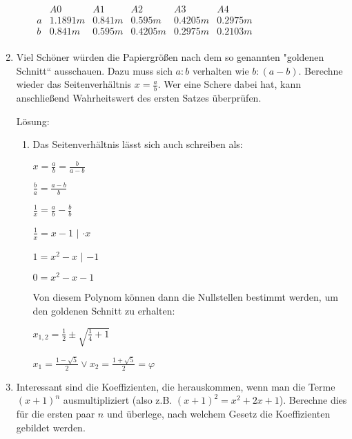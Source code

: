\documentclass[main.tex]{subfiles}
\begin{document}
\begin{enumerate}
\begin{enumerate}
		            \(
		            \begin{array}{cccccc}
			              & A0       & A1      & A2       & A3       & A4       \\
			            \hline
			            a & 1.1891 m & 0.841 m & 0.595 m  & 0.4205 m & 0.2975 m \\
			            b & 0.841 m  & 0.595 m & 0.4205 m & 0.2975 m & 0.2103 m \\
		            \end{array}
		            \)
	      \end{enumerate}
	\item Viel Schöner würden die Papiergrößen nach dem so genannten "goldenen Schnitt“ ausschauen.
	      Dazu muss sich \(
	      a : b
	      \) verhalten wie \(
	      b : (a - b)
	      \). Berechne wieder das Seitenverhältnis \(
	      x = \frac{a}{b}
	      \). Wer eine Schere dabei hat,
	      kann anschließend Wahrheitswert des ersten Satzes überprüfen.

	      Lösung:
	      \begin{enumerate}
		      \item Das Seitenverhältnis lässt sich auch schreiben als:

		            \(
		            x
		            = \frac{a}{b}
		            = \frac{b}{a-b}
		            \)

		            \(
		            \frac{b}{a}
		            = \frac{a-b}{b}
		            \)

		            \(
		            \frac{1}{x}
		            = \frac{a}{b} - \frac{b}{b}
		            \)

		            \(
		            \frac{1}{x}
		            = x - 1
		            \)
		            \(|\) \(
		            \cdot x
		            \)

		            \(
		            1
		            = x^2 - x
		            \)
		            \(|\) \(
		            -1
		            \)

		            \(
		            0 = x^2 - x - 1
		            \)

		            Von diesem Polynom können dann die Nullstellen bestimmt werden, um den goldenen Schnitt zu erhalten:

		            \(
		            x_{1,2} = \frac{1}{2} \pm \sqrt{
			            \frac{1}{4} + 1
		            }
		            \)

		            \(
		            x_1 = \frac{1 - \sqrt{5}}{2} \lor
		            x_2 = \frac{1 + \sqrt{5}}{2} = \varphi
		            \)
	      \end{enumerate}
	\item Interessant sind die Koeffizienten, die herauskommen, wenn man die Terme \(
	      (x + 1)^n
	      \) ausmultipliziert (also z.B. \(
	      (x + 1)^2 = x^2 + 2x + 1
	      \)).
	      Berechne dies für die ersten paar \(
	      n
	      \) und überlege, nach welchem Gesetz die Koeffizienten gebildet werden.


\end{enumerate}
\end{document}
